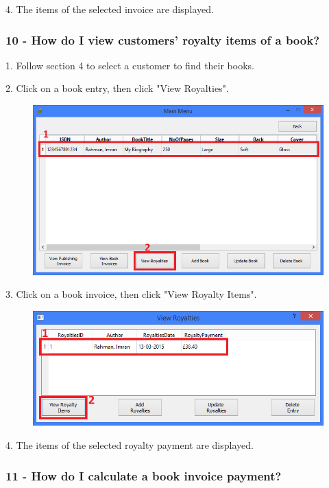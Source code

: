 4. The items of the selected invoice are displayed.

\subsubsection{10 -  How do I view customers' royalty items of a book?}

1. Follow section 4 to select a customer to find their books.

2. Click on a book entry, then click "View Royalties".

\begin{figure}[H]
    \includegraphics[width=\textwidth]{./Manual/Tutorial/Q10/ViewRoyalties.png}
\end{figure}

3. Click on a book invoice, then click "View Royalty Items".

\begin{figure}[H]
    \includegraphics[width=\textwidth]{./Manual/Tutorial/Q10/ViewRoyaltyItems.png}
\end{figure}

4. The items of the selected royalty payment are displayed.

\subsubsection{11 - How do I calculate a book invoice payment?}

